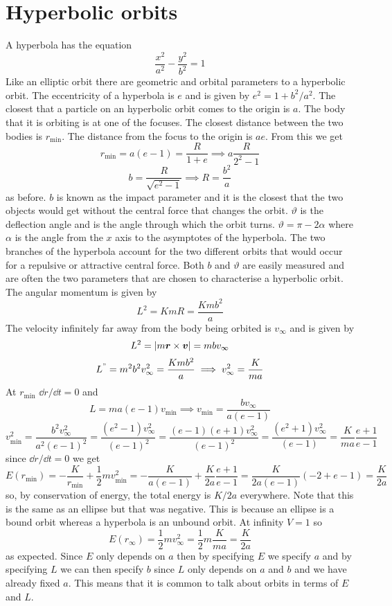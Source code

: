 \documentclass{article}
\begin{document}
    \section{Hyperbolic orbits}
    A hyperbola has the equation
    \[\frac{x^2}{a^2} - \frac{y^2}{b^2} = 1\]
    Like an elliptic orbit there are geometric and orbital parameters to a hyperbolic orbit.
    The eccentricity of a hyperbola is \(e\) and is given by \(e^2 = 1 + b^2/a^2\).
    The closest that a particle on an hyperbolic orbit comes to the origin is \(a\).
    The body that it is orbiting is at one of the focuses.
    The closest distance between the two bodies is \(r_\text{min}\).
    The distance from the focus to the origin is \(ae\).
    From this we get 
    \[r_\text{min} = a(e - 1) = \frac{R}{1 + e} \implies a \frac{R}{2^2 - 1}\]
    \[b = \frac{R}{\sqrt{e^2 - 1}}\implies R = \frac{b^2}{a}\]
    as before.
    \(b\) is known as the impact parameter and it is the closest that the two objects would get without the central force that changes the orbit.
    \(\vartheta\) is the deflection angle and is the angle through which the orbit turns.
    \(\vartheta = \pi - 2\alpha\) where \(\alpha\) is the angle from the \(x\) axis to the asymptotes of the hyperbola.
    The two branches of the hyperbola account for the two different orbits that would occur for a repulsive or attractive central force.
    Both \(b\) and \(\vartheta\) are easily measured and are often the two parameters that are chosen to characterise a hyperbolic orbit.
    The angular momentum is given by
    \[L^2 = KmR = \frac{Kmb^2}{a}\]
    The velocity infinitely far away from the body being orbited is \(v_\infty\) and is given by
    \[L^2 = |m\bm{r}\times\bm{v}| = mbv_\infty\]
    \[L^" = m^2b^2v_\infty^2 = \frac{Kmb^2}{a}\implies v_\infty^2 = \frac{K}{ma}\]
    At \(r_\text{min}\) \(\dd r/\dd t = 0\) and
    \[L = ma(e - 1)v_\text{min} \implies v_\text{min} = \frac{bv_\infty}{a(e - 1)}\]
    \[v_\text{min}^2 = \frac{b^2 v_\infty^2}{a^2(e - 1)^2} = \frac{(e^2 - 1)v_\infty^2}{(e - 1)^2} = \frac{(e - 1)(e + 1)v_\infty^2}{(e - 1)^2} = \frac{(e^2 + 1)v_\infty^2}{(e - 1)} = \frac{K}{ma}\frac{e + 1}{e - 1}\]
    since \(\dd r/\dd t = 0\) we get
    \[E(r_\text{min}) = -\frac{K}{r_\text{min}} + \frac{1}{2}mv_\text{min}^2 = -\frac{K}{a(e - 1)} + \frac{K}{2a}\frac{e + 1}{e - 1} = \frac{K}{2a(e - 1)}(-2 + e - 1) = \frac{K}{2a}\]
    so, by conservation of energy, the total energy is \(K/2a\) everywhere.
    Note that this is the same as an ellipse but that was negative.
    This is because an ellipse is a bound orbit whereas a hyperbola is an unbound orbit.
    At infinity \(V = 1\) so
    \[E(r_\infty) = \frac{1}{2}mv_\infty^2 = \frac{1}{2}m\frac{K}{ma} = \frac{K}{2a}\]
    as expected.
    Since \(E\) only depends on \(a\) then by specifying \(E\) we specify \(a\) and by specifying \(L\) we can then specify \(b\) since \(L\) only depends on \(a\) and \(b\) and we have already fixed \(a\).
    This means that it is common to talk about orbits in terms of \(E\) and \(L\).
    
\end{document}
